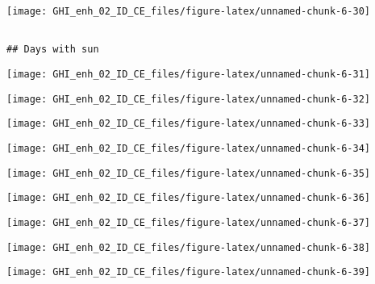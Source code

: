 \documentclass[
  10pt,
  a4paper,oneside]{article}
\begin{document}
\begin{center}\texttt{[image: GHI\_enh\_02\_ID\_CE\_files/figure-latex/unnamed-chunk-6-30]} \end{center}

\begin{verbatim}

## Days with sun 
\end{verbatim}

\begin{center}\texttt{[image: GHI\_enh\_02\_ID\_CE\_files/figure-latex/unnamed-chunk-6-31]} \end{center}

\begin{center}\texttt{[image: GHI\_enh\_02\_ID\_CE\_files/figure-latex/unnamed-chunk-6-32]} \end{center}

\begin{center}\texttt{[image: GHI\_enh\_02\_ID\_CE\_files/figure-latex/unnamed-chunk-6-33]} \end{center}

\begin{center}\texttt{[image: GHI\_enh\_02\_ID\_CE\_files/figure-latex/unnamed-chunk-6-34]} \end{center}

\begin{center}\texttt{[image: GHI\_enh\_02\_ID\_CE\_files/figure-latex/unnamed-chunk-6-35]} \end{center}

\begin{center}\texttt{[image: GHI\_enh\_02\_ID\_CE\_files/figure-latex/unnamed-chunk-6-36]} \end{center}

\begin{center}\texttt{[image: GHI\_enh\_02\_ID\_CE\_files/figure-latex/unnamed-chunk-6-37]} \end{center}

\begin{center}\texttt{[image: GHI\_enh\_02\_ID\_CE\_files/figure-latex/unnamed-chunk-6-38]} \end{center}

\begin{center}\texttt{[image: GHI\_enh\_02\_ID\_CE\_files/figure-latex/unnamed-chunk-6-39]} \end{center}
\end{document}
